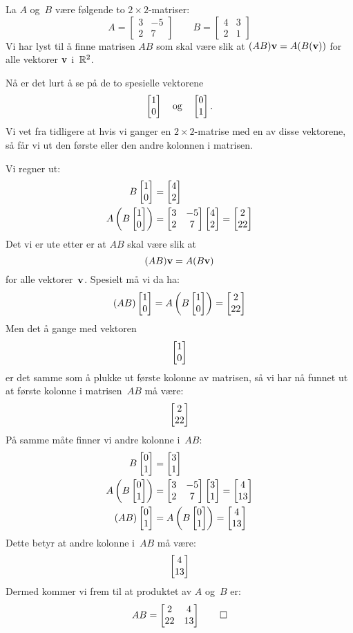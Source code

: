 \begin{ex}
La $A$ og~$B$ være følgende to $2 \times 2$-matriser:
\[
A =
\begin{bmatrix}
3 & -5 \\
2 &  7
\end{bmatrix}
\qquad
B =
\begin{bmatrix}
4 & 3 \\
2 & 1
\end{bmatrix}
\]
Vi har lyst til å finne matrisen $AB$ som skal være slik at
$(AB) \mathbf{v} = A(B(\mathbf{v}))$ for alle vektorer $\mathbf{v}$ i~$\mathbb{R}^2$.

Nå er det lurt å se på de to spesielle vektorene
\[
\begin{bmatrix} 1 \\ 0 \end{bmatrix}
\quad\text{og}\quad
\begin{bmatrix} 0 \\ 1 \end{bmatrix}.
\]
Vi vet fra tidligere at hvis vi ganger en $2 \times 2$-matrise med en
av disse vektorene, så får vi ut den første eller den andre kolonnen i
matrisen.

Vi regner ut:
\begin{align*}
B \begin{bmatrix} 1 \\ 0 \end{bmatrix} &= \begin{bmatrix} 4 \\ 2 \end{bmatrix} \\
A \left( B \begin{bmatrix} 1 \\ 0 \end{bmatrix} \right)
&=
\begin{bmatrix}
3 & -5 \\
2 &  7
\end{bmatrix}
\begin{bmatrix} 4 \\ 2 \end{bmatrix}
= \begin{bmatrix} 2 \\ 22 \end{bmatrix}
\end{align*}
Det vi er ute etter er at $AB$ skal være slik at
\[
(AB)\mathbf{v} = A(B\mathbf{v})
\]
for alle vektorer~$\mathbf{v}$.  Spesielt må vi da ha:
\[
(AB) \begin{bmatrix} 1 \\ 0 \end{bmatrix}
= A \left( B \begin{bmatrix} 1 \\ 0 \end{bmatrix} \right)
= \begin{bmatrix} 2 \\ 22 \end{bmatrix}
\]
Men det å gange med vektoren
\[
\begin{bmatrix} 1 \\ 0 \end{bmatrix}
\]
er det samme som å plukke ut første kolonne av matrisen, så vi har nå
funnet ut at første kolonne i matrisen~$AB$ må være:
\[
\begin{bmatrix} 2 \\ 22 \end{bmatrix}
\]
På samme måte finner vi andre kolonne i~$AB$:
\begin{align*}
B \begin{bmatrix} 0 \\ 1 \end{bmatrix} &= \begin{bmatrix} 3 \\ 1 \end{bmatrix}
\\
A \left( B \begin{bmatrix} 0 \\ 1 \end{bmatrix} \right)
&=
\begin{bmatrix}
3 & -5 \\
2 &  7
\end{bmatrix}
\begin{bmatrix} 3 \\ 1 \end{bmatrix}
= \begin{bmatrix} 4 \\ 13 \end{bmatrix}
\\
(AB) \begin{bmatrix} 0 \\ 1 \end{bmatrix} &= A \left( B \begin{bmatrix} 0 \\ 1 \end{bmatrix} \right) = \begin{bmatrix} 4 \\ 13 \end{bmatrix}
\end{align*}
Dette betyr at andre kolonne i~$AB$ må være:
\[
\begin{bmatrix} 4 \\ 13 \end{bmatrix}
\]
Dermed kommer vi frem til at produktet av $A$ og~$B$ er:
\[
AB =
\begin{bmatrix}
 2 &  4 \\
22 & 13
\end{bmatrix}
\qedhere
\]
\end{ex}

